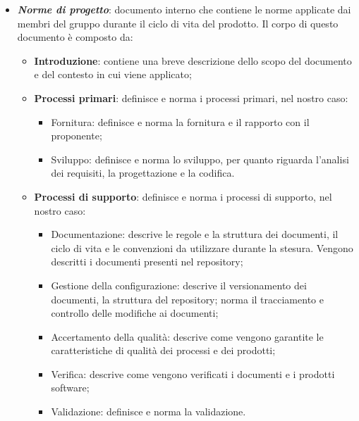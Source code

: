 \begin{itemize}
      \item \textit{\textbf{Norme di progetto}}: documento interno che contiene le norme applicate dai membri del gruppo durante il ciclo di vita del prodotto.
            Il corpo di questo documento è composto da:
            \begin{itemize}
                  \item \textbf{Introduzione}: contiene una breve descrizione dello scopo del documento e del contesto in cui viene applicato;
                  \item \textbf{Processi primari}: definisce e norma i processi primari, nel nostro caso:
                        \begin{itemize}
                              \item Fornitura: definisce e norma la fornitura e il rapporto con il proponente;
                              \item Sviluppo: definisce e norma lo sviluppo, per quanto riguarda l'analisi dei
                                    requisiti, la progettazione e la codifica.
                        \end{itemize}

                  \item \textbf{Processi di supporto}: definisce e norma i processi di supporto, nel nostro caso:
                        \begin{itemize}
                              \item Documentazione: descrive le regole e la struttura dei documenti, il ciclo di
                                    vita e le convenzioni da utilizzare durante la stesura. Vengono descritti i
                                    documenti presenti nel repository;
                              \item Gestione della configurazione: descrive il versionamento dei documenti, la
                                    struttura del repository; norma il tracciamento e controllo delle modifiche ai
                                    documenti;
                              \item Accertamento della qualità: descrive come vengono garantite le caratteristiche
                                    di qualità dei processi e dei prodotti;
                              \item Verifica: descrive come vengono verificati i documenti e i prodotti software;
                              \item Validazione: definisce e norma la validazione.
                        \end{itemize}


\end{itemize}
\end{itemize}
